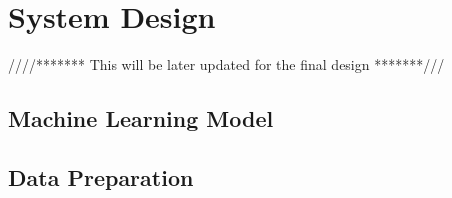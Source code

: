 \chapter{System Design}

////******* This will be later updated for the final design *******///

%
%
%
\section{Machine Learning Model}



\section{Data Preparation}

